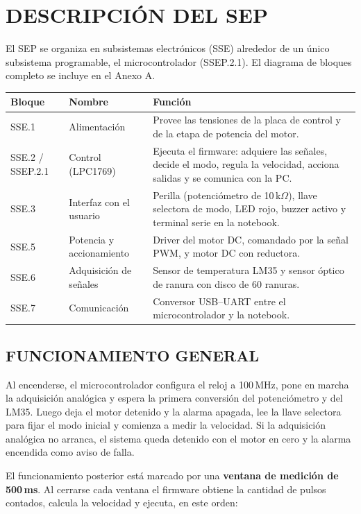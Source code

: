 \section{DESCRIPCIÓN DEL SEP}

El SEP se organiza en subsistemas electrónicos (SSE) alrededor de un único subsistema
programable, el microcontrolador (SSEP.2.1). El diagrama de bloques completo se incluye
en el Anexo A.

\begin{longtable}{|p{2.2cm}|p{4.2cm}|p{8.2cm}|}
\hline
\textbf{Bloque} & \textbf{Nombre} & \textbf{Función} \\ \hline
\endhead
SSE.1 & Alimentación & Provee las tensiones de la placa de control y de la etapa de
potencia del motor. \\ \hline
SSE.2 / SSEP.2.1 & Control (LPC1769) & Ejecuta el firmware: adquiere las señales, decide
el modo, regula la velocidad, acciona salidas y se comunica con la PC. \\ \hline
SSE.3 & Interfaz con el usuario & Perilla (potenciómetro de 10\,k$\Omega$), llave
selectora de modo, LED rojo, buzzer activo y terminal serie en la notebook. \\ \hline
SSE.5 & Potencia y accionamiento & Driver del motor DC, comandado por la señal PWM, y
motor DC con reductora. \\ \hline
SSE.6 & Adquisición de señales & Sensor de temperatura LM35 y sensor óptico de ranura
con disco de 60 ranuras. \\ \hline
SSE.7 & Comunicación & Conversor USB--UART entre el microcontrolador y la notebook. \\ \hline
\end{longtable}

\subsection{FUNCIONAMIENTO GENERAL}

Al encenderse, el microcontrolador configura el reloj a 100\,MHz, pone en marcha la
adquisición analógica y espera la primera conversión del potenciómetro y del LM35. Luego
deja el motor detenido y la alarma apagada, lee la llave selectora para fijar el modo
inicial y comienza a medir la velocidad. Si la adquisición analógica no arranca, el
sistema queda detenido con el motor en cero y la alarma encendida como aviso de falla.

El funcionamiento posterior está marcado por una \textbf{ventana de medición de 500\,ms}.
Al cerrarse cada ventana el firmware obtiene la cantidad de pulsos contados, calcula la
velocidad y ejecuta, en este orden:

